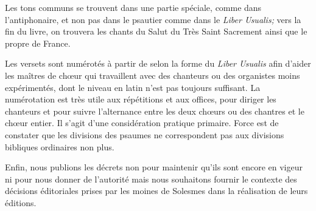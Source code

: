 \begin{frpars}
Les tons communs se trouvent dans une partie spéciale, comme dans l'antiphonaire, et non pas dans le psautier comme dans  le \textit{Liber Usualis;} vers la fin du livre, on trouvera les chants du Salut du Très Saint Sacrement ainsi que le propre de France.

Les versets sont numérotés à partir de  selon la forme du \textit{Liber Usualis} afin d'aider les maîtres de chœur qui travaillent avec des chanteurs ou des organistes moins expérimentés, dont le niveau en latin n'est pas toujours suffisant. La numérotation est très utile aux répétitions et aux offices, pour diriger les chanteurs et pour suivre l'alternance entre les deux chœurs ou des chantres et le chœur entier. Il s'agit d'une considération pratique primaire. Force est de constater que les divisions des psaumes ne correspondent pas aux divisions bibliques ordinaires non plus.

Enfin, nous publions les décrets non pour maintenir qu'ils sont encore en vigeur ni pour nous donner de l'autorité mais nous souhaitons fournir le contexte des décisions éditoriales prises par les moines de Solesmes dans la réalisation de leurs éditions.
\end{frpars}